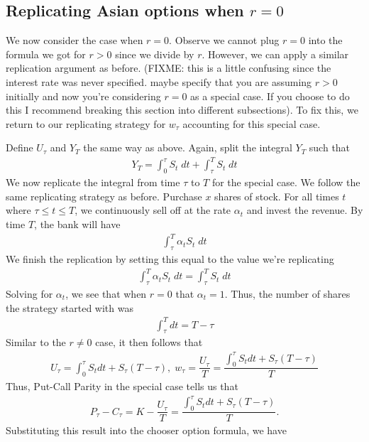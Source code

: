 \documentclass[reqno]{amsart}
\begin{document}
\subsection{Replicating Asian options when $r = 0$}
We now consider the case when $r=0$. Observe we cannot plug $r=0$ into the formula we got for $r > 0$ since we divide by $r$. However, we can apply a similar replication argument as before. (FIXME: this is a little confusing since the interest rate was never specified. maybe specify that you are assuming $r > 0$ initially and now you're considering $r = 0$ as a special case. If you choose to do this I recommend breaking this section into different subsections). To fix this, we return to our replicating strategy for $w_\tau$ accounting for this special case.

Define $U_\tau$ and $Y_T$ the same way as above. Again, split the integral $Y_T$ such that
\begin{align}
     Y_T = \int_0^\tau S_t \; dt + \int_\tau^T S_t \; dt
\end{align}
We now replicate the integral from time $\tau$ to $T$ for the special case. We follow the same replicating strategy as before. Purchase $x$ shares of stock. For all times $t$ where $\tau \leq t \leq T$, we continuously sell off at the rate $\alpha_t$ and invest the revenue. 
By time $T$, the bank will have 
\begin{align}
     \int_\tau^T \alpha_t S_t \; dt
\end{align}
We finish the replication by setting this equal to the value we're replicating
\begin{align}
     \int_\tau^T \alpha_t S_t \; dt = \int_\tau^T S_t \; dt
\end{align}
Solving for $\alpha_t$, we see that when $r = 0$ that $\alpha_t = 1$. Thus, the number of shares the strategy started with was
\begin{align}
     \int_\tau^T dt = T - \tau
\end{align}
Similar to the $r \neq 0$ case, it then follows that
\begin{align}
     U_\tau = \int_0^\tau S_t dt + S_\tau (T - \tau), \; w_\tau = \dfrac{U_\tau}{T} = \dfrac{\int_0^\tau S_t dt + S_\tau (T - \tau)}{T}
\end{align}
Thus, Put-Call Parity in the special case tells us that 
\begin{align}
     P_\tau - C_\tau = K - \dfrac{U_\tau}{T} = \dfrac{\int_0^\tau S_t dt + S_\tau (T - \tau)}{T}.
\end{align}
Substituting this result into the chooser option formula, we have
\end{document}

